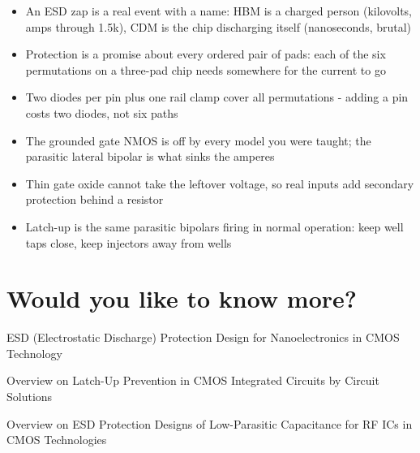 \begin{itemize}
\tightlist
\item
  An ESD zap is a real event with a name: HBM is a charged person
  (kilovolts, amps through 1.5k), CDM is the chip discharging itself
  (nanoseconds, brutal)
\item
  Protection is a promise about every ordered pair of pads: each of the
  six permutations on a three-pad chip needs somewhere for the current
  to go
\item
  Two diodes per pin plus one rail clamp cover all permutations - adding
  a pin costs two diodes, not six paths
\item
  The grounded gate NMOS is off by every model you were taught; the
  parasitic lateral bipolar is what sinks the amperes
\item
  Thin gate oxide cannot take the leftover voltage, so real inputs add
  secondary protection behind a resistor
\item
  Latch-up is the same parasitic bipolars firing in normal operation:
  keep well taps close, keep injectors away from wells
\end{itemize}

\section{Would you like to know
more?}\label{would-you-like-to-know-more}

ESD (Electrostatic Discharge) Protection Design for Nanoelectronics in
CMOS Technology 

Overview on Latch-Up Prevention in CMOS Integrated Circuits by Circuit
Solutions 

Overview on ESD Protection Designs of Low-Parasitic Capacitance for RF
ICs in CMOS Technologies 

